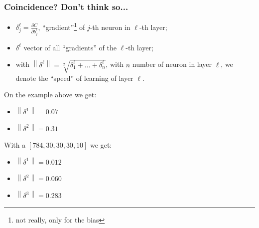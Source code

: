 \documentclass[usenames,dvipsnames]{beamer}
\newcommand{\norm}[1]{\left\lVert#1\right\rVert}
\begin{document}
\begin{frame}
\frametitle{Coincidence? Don't think so...}

\begin{itemize}
  \item $\delta^\ell_j = \frac{\partial C}{\partial b^\ell_j}$, ``gradient''\footnote{not really, only for the bias} of $j$-th neuron in $\ell$-th layer;
  \item $\delta^\ell$ vector of all ``gradients'' of the $\ell$-th layer;
  \item with $\norm{\delta^\ell} = \sqrt[2]{\delta^\ell_1 + \ldots + \delta^\ell_n}$, with $n$ number of neuron in layer $\ell$, we denote the ``speed'' of learning of layer $\ell$.
\end{itemize}

\vfill \pause

On the example above we get:
\begin{itemize}
  \item $\norm{\delta^1} = 0.07$
  \item $\norm{\delta^2} = 0.31$
\end{itemize}

\vfill \pause
With a $[784, 30, 30, 30, 10]$ we get:
\begin{itemize}
  \item $\norm{\delta^1} = 0.012$
  \item $\norm{\delta^2} = 0.060$
  \item $\norm{\delta^3} = 0.283$
\end{itemize}

  
\end{frame}
\end{document}
